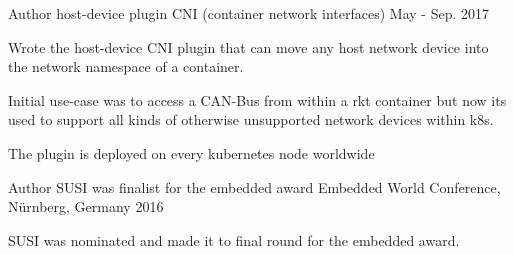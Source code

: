 


\begin{cventries}


\cventry
{Author} %
{host-device plugin} %
{CNI (container network interfaces)} %
{May - Sep. 2017} %
{ %
\begin{cvitems}
\item {Wrote the host-device CNI plugin that can move any host network device into the network namespace of a container.}
\item {Initial use-case was to access a CAN-Bus from within a rkt container but now its used to support all kinds of otherwise unsupported network devices within k8s.}
\item {The plugin is deployed on every kubernetes node worldwide}
\end{cvitems}
}


\cventry
{Author} %
{SUSI was finalist for the embedded award} %
{Embedded World Conference, Nürnberg, Germany} %
{2016} %
{ %
\begin{cvitems}
\item {SUSI was nominated and made it to final round for the embedded award.}
\end{cvitems}
}

\end{cventries}